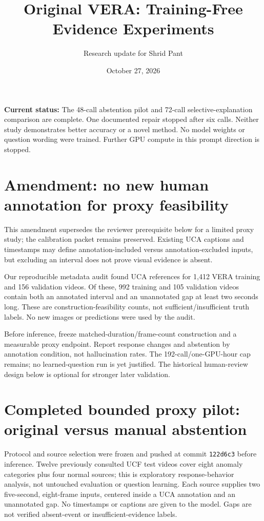\documentclass[11pt]{article}
\title{Original VERA: Training-Free Evidence Experiments}
\author{Research update for Shrid Pant}\date{October 27, 2026}
\begin{document}
\maketitle
\textbf{Current status:} The 48-call abstention pilot and 72-call selective-explanation comparison are complete. One documented repair stopped after six calls. Neither study demonstrates better accuracy or a novel method. No model weights or question wording were trained. Further GPU compute in this prompt direction is stopped.




\section{Amendment: no new human annotation for proxy feasibility}
This amendment supersedes the reviewer prerequisite below for a limited proxy study; the calibration packet remains preserved. Existing UCA captions and timestamps may define annotation-included versus annotation-excluded inputs, but excluding an interval does not prove visual evidence is absent.

Our reproducible metadata audit found UCA references for 1,412 VERA training and 156 validation videos. Of these, 992 training and 105 validation videos contain both an annotated interval and an unannotated gap at least two seconds long. These are construction-feasibility counts, not sufficient/insufficient truth labels. No new images or predictions were used by the audit.

Before inference, freeze matched-duration/frame-count construction and a measurable proxy endpoint. Report response changes and abstention by annotation condition, not hallucination rates. The 192-call/one-GPU-hour cap remains; no learned-question run is yet justified. The historical human-review design below is optional for stronger later validation.


\section{Completed bounded proxy pilot: original versus manual abstention}
Protocol and source selection were frozen and pushed at commit \texttt{122d6c3} before inference. Twelve previously consulted UCF test videos cover eight anomaly categories plus four normal sources; this is exploratory response-behavior analysis, not untouched evaluation or question learning. Each source supplies two five-second, eight-frame inputs, centered inside a UCA annotation and an unannotated gap. No timestamps or captions are given to the model. Gaps are not verified absent-event or insufficient-evidence labels.
\end{document}
